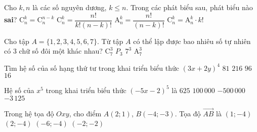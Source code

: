 \begin{ex}%
	Cho $k,n$ là các số nguyên dương, $k \leq n$. Trong các phát biểu sau, phát biểu nào \textbf{sai}?
	\choice
	{$\mathrm{C}_n^k=\mathrm{C}_n^{n-k}$}
	{$\mathrm{C}_n^k=\dfrac{n!}{k!(n-k)!}$}
	{$\mathrm{A}_n^k=\dfrac{n!}{(n-k)!}$}
	{\True $\mathrm{C}_n^k=\mathrm{A}_n^k \cdot k!$}
\end{ex}

\begin{ex}%
	Cho tập $A=\{1,2,3,4,5,6,7\}$. Từ tập $A$ có thể lập được bao nhiêu số tự nhiên có $3$ chữ số đôi một khác nhau?
	\choice
	{$\mathrm{C}_7^3$}
	{$P_3$}
	{$7^3$}
	{\True $\mathrm{A}_7^3$}
\end{ex}

\begin{ex}%
	Tìm hệ số của số hạng thứ tư trong khai triển biểu thức $(3x + 2y)^{4}$
	\choice
	{$81$}
	{$216$}
	{\True $96$}
	{$16$}
\end{ex}

\begin{ex}%
	Hệ số của $x^5$ trong khai triển biểu thức $\left(- 5x - 2\right)^5$ là
	\choice
	{$625$}
	{$100\,000$}
	{$-500\,000$}
	{\True $-3\,125$}
\end{ex}

\begin{ex}%
	Trong hệ tọa độ $Oxy$, cho điểm $A(2;1)$, $B(-4;-3)$. Tọa độ $\vec{AB}$ là
	\choice
	{$(1;-4)$}
	{$(2;-4)$}
	{\True $(-6;-4)$}
	{$(-2;-2)$}
	\loigiai{

	}
\end{ex}

